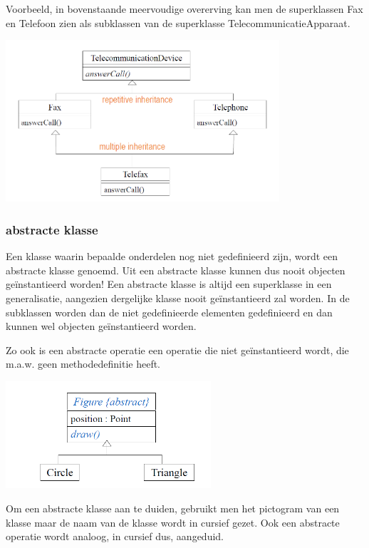 Voorbeeld, in bovenstaande meervoudige overerving kan men de superklassen Fax en Telefoon zien als subklassen van de superklasse TelecommunicatieApparaat.


\begin{center}
\includegraphics[width=4in]{img/con2}%
\end{center}
\newpage
\subsubsection{abstracte klasse}

Een klasse waarin bepaalde onderdelen nog niet gedefinieerd zijn, wordt een abstracte klasse genoemd. Uit een abstracte klasse kunnen dus nooit objecten geïnstantieerd worden!
Een abstracte klasse is altijd een superklasse in een generalisatie, aangezien dergelijke klasse nooit geïnstantieerd zal worden. In de subklassen worden dan de niet gedefinieerde elementen gedefinieerd en dan kunnen wel objecten geïnstantieerd worden.

Zo ook is een abstracte operatie een operatie die niet geïnstantieerd wordt, die m.a.w. geen methodedefinitie heeft.


\begin{center}
\includegraphics[width=3in]{img/abs1}%
\end{center}

Om een abstracte klasse aan te duiden, gebruikt men het pictogram van een klasse maar de naam van de klasse wordt in cursief gezet. Ook een abstracte operatie wordt analoog, in cursief dus, aangeduid.
\newpage
